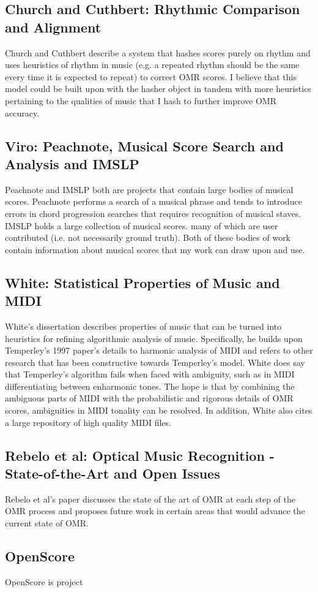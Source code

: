 \subsection{Church and Cuthbert: Rhythmic Comparison and Alignment}
Church and Cuthbert \cite{church} describe a system that hashes scores purely on rhythm and uses heuristics of rhythm in music (e.g. a repeated rhythm should be the same every time it is expected to repeat) to correct OMR scores. I believe that this model could be built upon with the hasher object in tandem with more heuristics pertaining to the qualities of music that I hash to further improve OMR accuracy.

\subsection{Viro: Peachnote, Musical Score Search and Analysis and IMSLP}
Peachnote \cite{peachnote} and IMSLP \cite{imslp} both are projects that contain large bodies of musical scores. Peachnote performs a search of a musical phrase and tends to introduce errors in chord progression searches that requires recognition of musical staves. IMSLP holds a large collection of musical scores. many of which are user contributed (i.e. not necessarily ground truth). Both of these bodies of work contain information about musical scores that my work can draw upon and use. 

\subsection{White: Statistical Properties of Music and MIDI}
White's dissertation \cite{white} describes properties of music that can be turned into heuristics for refining algorithmic analysis of music. Specifically, he builds upon Temperley's 1997 \cite{temperley} paper's details to harmonic analysis of MIDI and refers to other research that has been constructive towards Temperley's model. White does say that Temperley's algorithm fails when faced with ambiguity, such as in MIDI differentiating between enharmonic tones. The hope is that by combining the ambiguous parts of MIDI with the probabilistic and rigorous details of OMR scores, ambiguities in MIDI tonality can be resolved. In addition, White also cites a large repository of high quality MIDI files. 

\subsection{Rebelo et al: Optical Music Recognition - State-of-the-Art and Open Issues}
Rebelo et al's paper discusses the state of the art of OMR at each step of the OMR process and proposes future work in certain areas that would advance the current state of OMR. 
\cite{rebelo}

\subsection{OpenScore}
OpenScore is project
